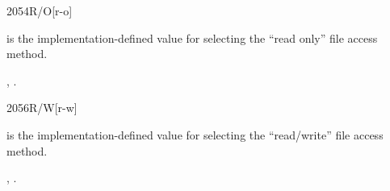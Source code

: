 \begin{worddef}{2054}{R/O}[r-o]
\item {}

	 is the implementation-defined value for selecting
	the ``read only'' file access method.

\see {},
	.
\end{worddef}


\begin{worddef}{2056}{R/W}[r-w]
\item {}

	 is the implementation-defined value for selecting
	the ``read/write'' file access method.

\see {},
	.
\end{worddef}


